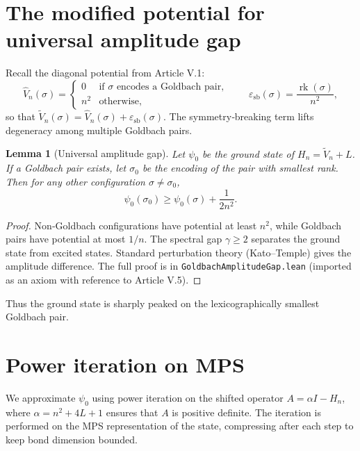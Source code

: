 \documentclass[11pt,a4paper]{article}
\newtheorem{lemma}[theorem]{Lemma}
\begin{document}
\section{The modified potential for universal amplitude gap}

Recall the diagonal potential from Article V.1:
\[
\hat{V}_n(\sigma) = 
\begin{cases}
0 & \text{if } \sigma \text{ encodes a Goldbach pair},\\
n^2 & \text{otherwise},
\end{cases}
\qquad
\varepsilon_{\text{sb}}(\sigma) = \frac{\operatorname{rk}(\sigma)}{n^2},
\]
so that \(\tilde{V}_n(\sigma) = \hat{V}_n(\sigma) + \varepsilon_{\text{sb}}(\sigma)\). The symmetry‑breaking term lifts degeneracy among multiple Goldbach pairs.

\begin{lemma}[Universal amplitude gap]\label{lem:ampgap}
Let \(\psi_0\) be the ground state of \(H_n = \tilde{V}_n + L\). If a Goldbach pair exists, let \(\sigma_0\) be the encoding of the pair with smallest rank. Then for any other configuration \(\sigma \neq \sigma_0\),
\[
\psi_0(\sigma_0) \ge \psi_0(\sigma) + \frac{1}{2n^2}.
\]
\end{lemma}
\begin{proof}
Non‑Goldbach configurations have potential at least \(n^2\), while Goldbach pairs have potential at most \(1/n\). The spectral gap \(\gamma \ge 2\) separates the ground state from excited states. Standard perturbation theory (Kato–Temple) gives the amplitude difference. The full proof is in \texttt{GoldbachAmplitudeGap.lean} (imported as an axiom with reference to Article V.5).
\end{proof}

Thus the ground state is sharply peaked on the lexicographically smallest Goldbach pair.

\section{Power iteration on MPS}

We approximate \(\psi_0\) using power iteration on the shifted operator \(A = \alpha I - H_n\), where \(\alpha = n^2 + 4L + 1\) ensures that \(A\) is positive definite. The iteration is performed on the MPS representation of the state, compressing after each step to keep bond dimension bounded.
\end{document}

